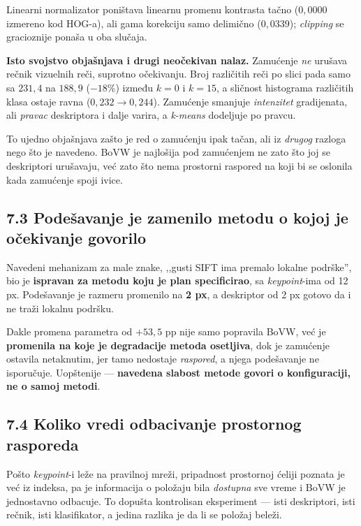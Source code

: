 \documentclass[11pt,a4paper]{article}
\begin{document}
Linearni normalizator poništava linearnu promenu kontrasta tačno ($0{,}0000$ izmereno kod
HOG-a), ali gama korekciju samo delimično ($0{,}0339$); \textit{clipping} se gracioznije ponaša u oba
slučaja.

\textbf{Isto svojstvo objašnjava i drugi neočekivan nalaz.} Zamućenje \emph{ne} urušava rečnik
vizuelnih reči, suprotno očekivanju. Broj različitih reči po slici pada samo sa $231{,}4$ na
$188{,}9$ ($-18\%$) između $k=0$ i $k=15$, a sličnost histograma različitih klasa ostaje ravna
($0{,}232 \to 0{,}244$). Zamućenje smanjuje \emph{intenzitet} gradijenata, ali \emph{pravac}
deskriptora i dalje varira, a \textit{k-means} dodeljuje po pravcu.

To ujedno objašnjava zašto je red o zamućenju ipak tačan, ali iz \emph{drugog} razloga nego što
je navedeno. BoVW je najlošija pod zamućenjem ne zato što joj se deskriptori urušavaju, već
zato što nema prostorni raspored na koji bi se oslonila kada zamućenje spoji ivice.

\subsection*{7.3 Podešavanje je zamenilo metodu o kojoj je očekivanje govorilo}

Navedeni mehanizam za male znake, ,,gusti SIFT ima premalo lokalne podrške'', bio je
\textbf{ispravan za metodu koju je plan specificirao}, sa \textit{keypoint}-ima od 12 px. Podešavanje
je razmeru promenilo na \textbf{2 px}, a deskriptor od 2 px gotovo da i ne traži lokalnu podršku.

Dakle promena parametra od $+53{,}5$ pp nije samo popravila BoVW, već je \textbf{promenila na
koje je degradacije metoda osetljiva}, dok je zamućenje ostavila netaknutim, jer tamo
nedostaje \emph{raspored}, a njega podešavanje ne isporučuje. Uopštenije — \textbf{navedena
slabost metode govori o konfiguraciji, ne o samoj metodi}.

\subsection*{7.4 Koliko vredi odbacivanje prostornog rasporeda}

Pošto \textit{keypoint}-i leže na pravilnoj mreži, pripadnost prostornoj ćeliji poznata je već iz
indeksa, pa je informacija o položaju bila \emph{dostupna} sve vreme i BoVW je jednostavno
odbacuje. To dopušta kontrolisan eksperiment — isti deskriptori, isti rečnik, isti klasifikator,
a jedina razlika je da li se položaj beleži.
\end{document}
